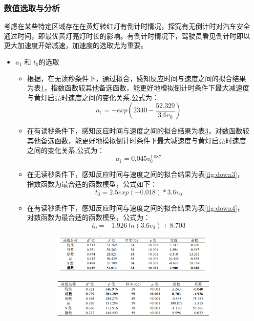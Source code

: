 \documentclass[withoutpreface,bwprint]{cumcmthesis}
\begin{document}
\subsubsection{数值选取与分析}
考虑在某些特定区域存在在黄灯转红灯有倒计时情况，探究有无倒计时对汽车安全通过时间，即最优黄灯亮灯时长的影响。有倒计时情况下，驾驶员看见倒计时即以更大加速度开始减速，加速度的选取尤为重要。
\begin{itemize}
	\item $a_1$ 和 $t_0$的选取
	\begin{itemize}
		\item 根据\cite{ref1}，在无读秒条件下，通过拟合，感知反应时间与速度之间的拟合结果为表\ref{fig:down1}，指数函数较其他备选函数，能更好地模拟倒计时条件下最大减速度与黄灯启亮时速度之间的变化关系,公式为：
		$$a_1 = -exp(2340-\frac{52.329}{3.6v_0})$$
		\item 在有读秒条件下，感知反应时间与速度之间的拟合结果为表\ref{fig:down2}，对数函数较其他备选函数，能更好地模拟倒计时条件下最大减速度与黄灯启亮时速度之间的变化关系,公式为：
		$$a_1 = 0.045v_0^{1.087}$$
		\item 在无读秒条件下，感知反应时间与速度之间的拟合结果为表\ref{fig:down3}，指数函数为最合适的函数模型，公式如下：
		$$t_0 = 2.5exp(-0.018)*3.6v_0$$ 
		\item 在有读秒条件下，感知反应时间与速度之间的拟合结果为表\ref{fig:down4}，对数函数为最合适的函数模型，公式为：
		$$t_0 = -1.926\ ln(3.6v_0)+8.703$$
	\end{itemize}
		\begin{figure}[htbp!]
		\centering
		\begin{subfigure}[t]{0.47\textwidth}
			\centering
			\includegraphics[width=\textwidth]{pics/fyc1}
			\label{fig:down1}
		\end{subfigure}
		\hfill %
		\begin{subfigure}[t]{0.47\textwidth}
			\centering
			\includegraphics[width=\textwidth]{pics/fyc2}
			\label{fig:down2}
		\end{subfigure}
		

\end{figure}
\end{itemize}
\end{document}
